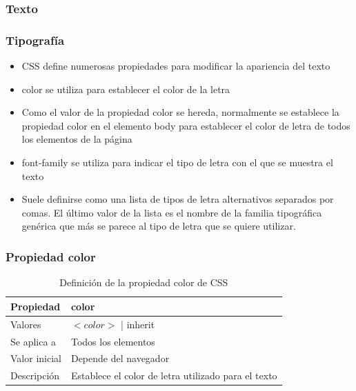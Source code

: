 \subsubsection*{Texto}

\begin{frame}
\frametitle{Tipografía}

\begin{itemize}
  \item CSS define numerosas propiedades para modificar la apariencia del texto
  \item color se utiliza para establecer el color de la letra
  \item Como el valor de la propiedad color se hereda, normalmente se establece la propiedad color en el elemento body para establecer el color de letra de todos los elementos de la página
 \item font-family se utiliza para indicar el tipo de letra con el que se muestra el texto
  \item Suele definirse como una lista de tipos de letra alternativos separados por comas. El último valor de la lista es el nombre de la familia tipográfica genérica que más se parece al tipo de letra que se quiere utilizar.
\end{itemize}

\end{frame}



\begin{frame}
\frametitle{Propiedad color}

\begin{center}
  \begin{table}
   \begin{tabular}{p{1.8cm}p{7.8cm}}
Propiedad & \bf{color} \\ \hline
Valores& $<color>$ | inherit \\ \hline
Se aplica a& Todos los elementos \\ \hline
Valor inicial& Depende del navegador \\ \hline
Descripción& Establece el color de letra utilizado para el texto \\ \hline
  \end{tabular}
   \caption{Definición de la propiedad color de CSS}
 \end{table}
\end{center}


\end{frame}


